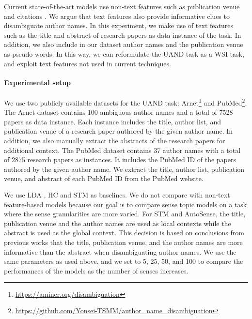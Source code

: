 \documentclass[letterpaper]{article} \usepackage{aaai19}
\begin{document}
Current state-of-the-art models use non-text features such as publication venue and citations \cite{tang2012unified}.  We argue that text features also provide informative clues to disambiguate author names. In this experiment, we make use of text features such as the title and abstract of research papers as data instance of the task. In addition, we also include in our dataset author names and the publication venue as pseudo-words. In this way, we can reformulate the UAND task as a WSI task, and exploit text features not used in current techniques.

\paragraph{Experimental setup}

We use two publicly available datasets for the UAND task: Arnet\footnote{\url{https://aminer.org/disambiguation}} and PubMed\footnote{\url{https://github.com/Yonsei-TSMM/author_name_disambiguation}}. The Arnet dataset contains 100 ambiguous author names and a total of 7528 papers as data instance. Each instance includes the title, author list, and publication venue of a research paper authored by the given author name. In addition, we also manually extract the abstracts of the research papers for additional context.
The PubMed dataset contains 37 author names with a total of 2875 research papers as instances. It includes the PubMed ID of the papers authored by the given author name. We extract the title, author list, publication venue, and abstract of each PubMed ID from the PubMed website.

We use LDA \cite{blei2003latent}, HC \cite{chang2014inducing} and STM \cite{wang2015sense} as baselines. We do not compare with non-text feature-based models \cite{tang2012unified,cen2013author} because our goal is to compare sense topic models on a task where the sense granularities are more varied. For STM and AutoSense, the title, publication venue and the author names are used as local contexts while the abstract is used as the global context. This decision is based on conclusions from previous works \cite{tang2012unified} that the title, publication venue, and the author names are more informative than the abstract when disambiguating author names. We use the same parameters as used above, and we set  to 5, 25, 50, and 100 to compare the performances of the models as the number of senses increases.
\end{document}
